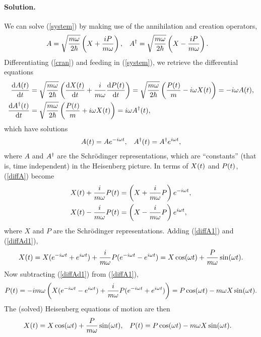 \documentclass[11pt]{article}
\newcommand{\refeq}[1]{(\ref{#1})}
\newenvironment{solution}
{
    \paragraph{Solution.}
    \ignorespaces
}
{
}
\newcommand{\Schrodinger}{Schr\"{o}dinger}
\begin{document}
\begin{solution}
	We can solve \refeq{system} by making use of the annihilation and creation operators,
	\begin{align} \label{cran}
		A &= \sqrt{\frac{m \omega}{2\hbar}} \left( X + \frac{i P}{m \omega} \right), &
		A^\dagger &= \sqrt{\frac{m \omega}{2\hbar}} \left( X - \frac{i P}{m \omega} \right).
	\end{align}
	Differentiating \refeq{cran} and feeding in \refeq{system}, we retrieve the differential equations
	\begin{align}
		\dv{A(t)}{t} &= \sqrt{\frac{m \omega}{2\hbar}} \left( \dv{X(t)}{t} + \frac{i}{m\omega} \dv{P(t)}{t} \right) = \sqrt{\frac{m \omega}{2\hbar}} \left( \frac{P(t)}{m} - i \omega X(t) \right) = -i \omega A(t), \\
		\dv{A^\dagger(t)}{t} &= \sqrt{\frac{m \omega}{2\hbar}} \left( \frac{P(t)}{m} + i \omega X(t) \right) = i\omega A^\dagger(t),
	\end{align}
	which have solutions
	\begin{align} \label{diffA}
		A(t) &= A e^{-i \omega t}, & A^\dagger(t) = A^\dagger e^{i \omega t},
	\end{align}
	where $A$ and $A^\dagger$ are the {\Schrodinger} representations, which are ``constants'' (that is, time independent) in the Heisenberg picture.  In terms of $X(t)$ and $P(t)$, \refeq{diffA} become
	\begin{align}
		X(t) + \frac{i}{m \omega} P(t) &= \left(X + \frac{i}{m \omega} P \right) e^{-i\omega t}, \label{diffA1} \\
		X(t) - \frac{i}{m \omega} P(t) &= \left(X - \frac{i}{m \omega} P \right) e^{i\omega t}, \label{diffAd1}
	\end{align}
	where $X$ and $P$ are the {\Schrodinger} representations.  Adding \refeq{diffA1} and \refeq{diffAd1},
	\begin{equation}
		X(t) = X (e^{-i\omega t} + e^{i\omega t}) + \frac{i}{m \omega} P (e^{-i\omega t} - e^{i\omega t}) = X \cos(\omega t) + \frac{P}{m \omega} \sin(\omega t).
	\end{equation}
	Now subtracting \refeq{diffAd1} from \refeq{diffA1},
	\begin{equation}
		P(t) = -i m \omega \left( X (e^{-i\omega t} - e^{i\omega t}) + \frac{i}{m \omega} P (e^{-i\omega t} + e^{i\omega t}) \right) = P \cos(\omega t) - m \omega X \sin(\omega t).
	\end{equation}
	The (solved) Heisenberg equations of motion are then
	\begin{align} \label{heissol}
		X(t) &= X \cos(\omega t) + \frac{P}{m \omega} \sin(\omega t), & P(t) &= P \cos(\omega t) - m \omega X \sin(\omega t).
	\end{align}
\end{solution}
\end{document}
